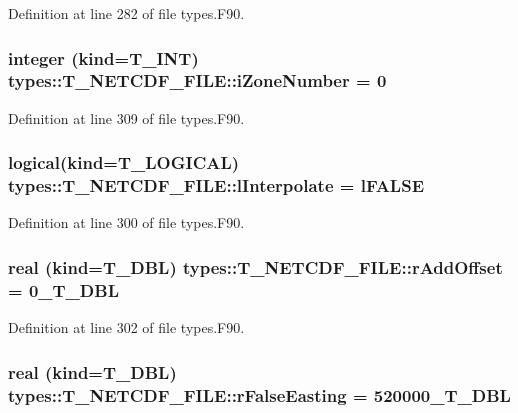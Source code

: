 Definition at line 282 of file types.F90.

\hypertarget{typetypes_1_1_t___n_e_t_c_d_f___f_i_l_e_a3d905f146a75982f5e4d3f8fb1711604}{
\subsubsection[{iZoneNumber}]{\setlength{\rightskip}{0pt plus 5cm}integer (kind={\bf T\_\-INT}) {\bf types::T\_\-NETCDF\_\-FILE::iZoneNumber} = 0}}
\label{typetypes_1_1_t___n_e_t_c_d_f___f_i_l_e_a3d905f146a75982f5e4d3f8fb1711604}


Definition at line 309 of file types.F90.

\hypertarget{typetypes_1_1_t___n_e_t_c_d_f___f_i_l_e_a7954e4a70d839ef6181f397ecd48591e}{
\subsubsection[{lInterpolate}]{\setlength{\rightskip}{0pt plus 5cm}logical(kind={\bf T\_\-LOGICAL}) {\bf types::T\_\-NETCDF\_\-FILE::lInterpolate} = {\bf lFALSE}}}
\label{typetypes_1_1_t___n_e_t_c_d_f___f_i_l_e_a7954e4a70d839ef6181f397ecd48591e}


Definition at line 300 of file types.F90.

\hypertarget{typetypes_1_1_t___n_e_t_c_d_f___f_i_l_e_a16488bc447262fc886c50892ec58dcd0}{
\subsubsection[{rAddOffset}]{\setlength{\rightskip}{0pt plus 5cm}real (kind={\bf T\_\-DBL}) {\bf types::T\_\-NETCDF\_\-FILE::rAddOffset} = 0\_\-T\_\-DBL}}
\label{typetypes_1_1_t___n_e_t_c_d_f___f_i_l_e_a16488bc447262fc886c50892ec58dcd0}


Definition at line 302 of file types.F90.

\hypertarget{typetypes_1_1_t___n_e_t_c_d_f___f_i_l_e_a0adfbddbcbca82f0762c5413b309cf75}{
\subsubsection[{rFalseEasting}]{\setlength{\rightskip}{0pt plus 5cm}real (kind={\bf T\_\-DBL}) {\bf types::T\_\-NETCDF\_\-FILE::rFalseEasting} = 520000\_\-T\_\-DBL}}
\label{typetypes_1_1_t___n_e_t_c_d_f___f_i_l_e_a0adfbddbcbca82f0762c5413b309cf75}


